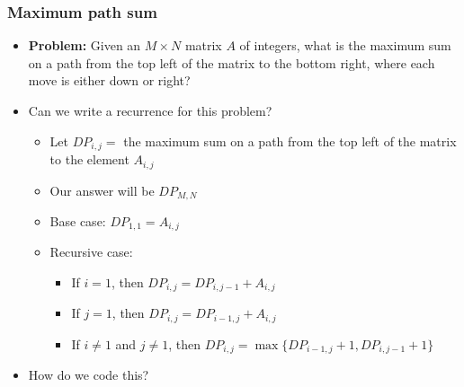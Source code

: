 \documentclass[t]{beamer}
\begin{document}
\begin{frame}

    \frametitle{Maximum path sum}

    \begin{itemize}

        \item

        \textbf{Problem:} Given an $M \times N$ matrix $A$ of integers, what is the maximum sum on a path from the top left of the matrix to the bottom right, where each move is either down or right?

        \pause

        \item

        Can we write a recurrence for this problem?

        \pause

        \begin{itemize}

            \item

            Let $DP_{i,j} = $ the maximum sum on a path from the top left of the matrix to the element $A_{i,j}$

            \pause

            \item

            Our answer will be $DP_{M,N}$

            \pause

            \item

            Base case: $DP_{1,1} = A_{i,j}$

            \item

            Recursive case:

            \begin{itemize}

                \item

                If $i = 1$, then $DP_{i,j} = DP_{i,j-1} + A_{i,j}$

                \item

                If $j = 1$, then $DP_{i,j} = DP_{i-1,j} + A_{i,j}$

                \item

                If $i \neq 1$ and $j \neq 1$, then $DP_{i,j} = \max \{DP_{i-1,j} + 1, DP_{i,j-1} + 1\}$

            \end{itemize}

        \end{itemize}

        \pause

        \item

        How do we code this?

    \end{itemize}

\end{frame}
\end{document}
